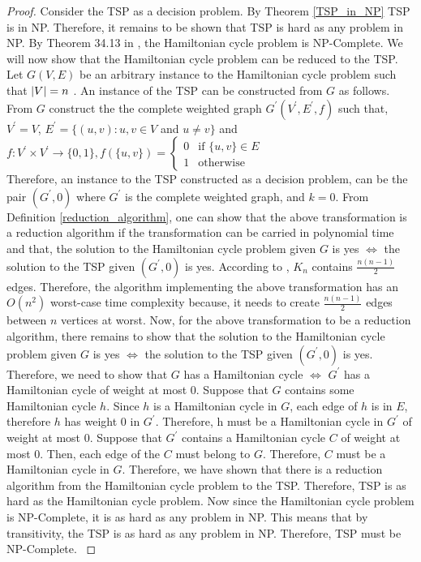 \documentclass[12pt]{article}
\numberwithin{equation}{subsection}
\numberwithin{table}{subsection}
\begin{document}
\begin{proof}
Consider the TSP as a decision problem. By Theorem \ref{TSP_in_NP} TSP is in NP. Therefore, it remains to be shown that TSP is hard as any problem in NP. By Theorem 34.13 in \cite{cormen_leiserson_rivest_stein}, the Hamiltonian cycle problem is NP-Complete. We will now show that the Hamiltonian cycle problem can be reduced to the TSP. Let $G(V,E)$ be an arbitrary instance to the Hamiltonian cycle problem such that $\abs{V} = n$ . An instance of the TSP can be constructed from $G$ as follows. From $G$ construct the the complete weighted graph $G^\prime(V^\prime,E^\prime,f)$ such that, $V^\prime=V$, $E^\prime=\{(u, v) : u, v \in V$ and $u \neq v\}$ and \\
$f\colon V^\prime \times V^\prime \to \{0,1\}, f(\{u, v\}) = \begin{cases} 0& \text{if } \{u, v\} \in E\\ 1              & \text{otherwise} \end{cases}$\\
Therefore, an instance to the TSP constructed as a decision problem, can be the pair $(G^\prime,0)$ where $G^\prime$ is the complete weighted graph, and $k =0$. From Definition \ref{reduction_algorithm}, one can show that the above transformation is a reduction algorithm if the transformation can be carried in polynomial time and that, the solution to the Hamiltonian cycle problem given $G$ is yes $\iff$ the solution to the TSP given $(G^\prime,0)$ is yes. According to \cite{ray_2013}, $K_n$ contains $\frac{n(n-1)}{2}$ edges. Therefore, the algorithm implementing the above transformation has an $O(n^2)$ worst-case time complexity because, it needs to create $\frac{n(n-1)}{2}$ edges between $n$ vertices at worst. Now, for the above transformation to be a reduction algorithm, there remains to show that the solution to the Hamiltonian cycle problem given $G$ is yes $\iff$ the solution to the TSP given $(G^\prime,0)$ is yes. Therefore, we need to show that $G$ has a Hamiltonian cycle $\iff$ $G^\prime$ has a Hamiltonian cycle of weight at most 0. Suppose that $G$ contains some Hamiltonian cycle $h$. Since $h$ is a Hamiltonian cycle in $G$, each edge of $h$ is in $E$, therefore $h$ has weight 0 in $G^\prime$. Therefore, h must be a Hamiltonian cycle in $G^\prime$ of weight at most 0. Suppose that $G^\prime$ contains a Hamiltonian cycle $C$ of weight at most 0. Then, each edge of the $C$ must belong to $G$. Therefore, $C$ must be a Hamiltonian cycle in $G$. Therefore, we have shown that there is a reduction algorithm from the Hamiltonian cycle problem to the TSP. Therefore, TSP is as hard as the Hamiltonian cycle problem. Now since the Hamiltonian cycle problem is NP-Complete, it is as hard as any problem in NP. This means that by transitivity, the TSP is as hard as any problem in NP. Therefore, TSP must be NP-Complete. \cite{cormen_leiserson_rivest_stein}
\end{proof}
\end{document}
